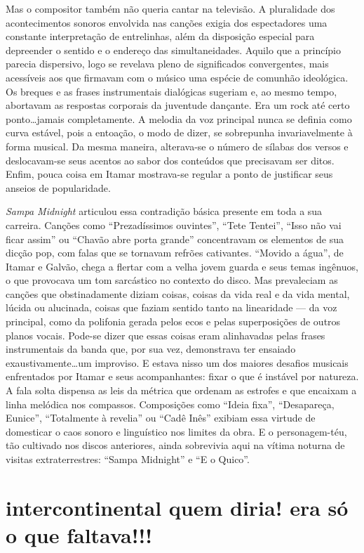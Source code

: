 Mas o compositor também não queria cantar na televisão. A pluralidade
dos acontecimentos sonoros envolvida nas canções exigia dos espectadores
uma constante interpretação de entrelinhas, além da disposição especial
para depreender o sentido e o endereço das simultaneidades. Aquilo que a
princípio parecia dispersivo, logo se revelava pleno de significados
convergentes, mais acessíveis aos que firmavam com o músico uma espécie
de comunhão ideológica. Os breques e as frases instrumentais dialógicas
sugeriam e, ao mesmo tempo, abortavam as respostas corporais da
juventude dançante. Era um rock até certo ponto\ldots jamais completamente.
A melodia da voz principal nunca se definia como curva estável, pois a
entoação, o modo de dizer, se sobrepunha invariavelmente à forma
musical. Da mesma maneira, alterava-se o número de sílabas dos versos e
deslocavam-se seus acentos ao sabor dos conteúdos que precisavam ser
ditos. Enfim, pouca coisa em Itamar mostrava-se regular a ponto de
justificar seus anseios de popularidade.

\textit{Sampa Midnight} articulou essa contradição básica presente em toda a sua
carreira. Canções como ``Prezadíssimos ouvintes'', ``Tete Tentei'', ``Isso não vai
ficar assim'' ou ``Chavão abre porta grande'' concentravam os elementos de sua
dicção pop, com falas que se tornavam refrões cativantes. ``Movido a água'', de Itamar e Galvão, chega a flertar com a velha jovem guarda e seus temas
ingênuos, o que provocava um tom sarcástico no contexto do disco. Mas
prevaleciam as canções que obstinadamente diziam coisas, coisas da vida
real e da vida mental, lúcida ou alucinada, coisas que faziam sentido
tanto na linearidade --- da voz principal, como da polifonia gerada pelos
ecos e pelas superposições de outros planos vocais. Pode-se dizer que
essas coisas eram alinhavadas pelas frases instrumentais da banda que,
por sua vez, demonstrava ter ensaiado exaustivamente\ldots um improviso. E
estava nisso um dos maiores desafios musicais enfrentados por Itamar e
seus acompanhantes: fixar o que é instável por natureza. A fala solta
dispensa as leis da métrica que ordenam as estrofes e que encaixam a
linha melódica nos compassos. Composições como ``Ideia fixa'', ``Desapareça,
Eunice'', ``Totalmente à revelia'' ou ``Cadê Inês'' exibiam essa virtude de
domesticar o caos sonoro e linguístico nos limites da obra. E o
personagem-téu, tão cultivado nos discos anteriores, ainda sobrevivia
aqui na vítima noturna de visitas extraterrestres: ``Sampa Midnight'' e ``E o
Quico''.

\section{intercontinental quem diria! era só o que faltava!!!}

